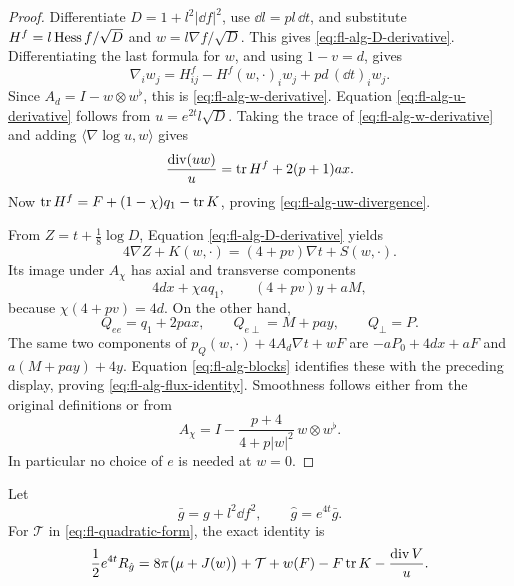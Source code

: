 \begin{proof}
Differentiate \(D=1+l^2|\dd f|^2\), use \(\dd l=pl\,\dd t\), and
substitute \(H^f=l\operatorname{Hess} f/\sqrt D\) and
\(w=l\nabla f/\sqrt D\). This gives
\eqref{eq:fl-alg-D-derivative}. Differentiating the last formula for
\(w\), and using \(1-v=d\), gives
\[
 \nabla_iw_j
 =H^f_{ij}-H^f(w,\cdot)_i w_j+pd\,(\dd t)_i w_j.
\]
Since \(A_d=I-w\otimes w^\flat\), this is
\eqref{eq:fl-alg-w-derivative}.
Equation \eqref{eq:fl-alg-u-derivative} follows from
\(u=e^{2t}l\sqrt D\).
Taking the trace of \eqref{eq:fl-alg-w-derivative} and adding
\(\langle\nabla\log u,w\rangle\) gives
\[
 \frac{\operatorname{div}(uw)}u
 =\operatorname{tr} H^f+2(p+1)ax.
\]
Now \(\operatorname{tr} H^f=F+(1-\chi)q_1-\operatorname{tr} K\), proving
\eqref{eq:fl-alg-uw-divergence}.

From \(Z=t+\frac18\log D\), Equation
\eqref{eq:fl-alg-D-derivative} yields
\[
 4\nabla Z+K(w,\cdot)=(4+pv)\nabla t+S(w,\cdot).
\]
Its image under \(A_\chi\) has axial and transverse components
\[
 4dx+\chi aq_1,\qquad (4+pv)y+aM,
\]
because \(\chi(4+pv)=4d\).
On the other hand,
\[
 Q_{ee}=q_1+2pa x,\qquad Q_{e\perp}=M+pa y,
 \qquad Q_\perp=P.
\]
The same two components of
\(p_Q(w,\cdot)+4A_d\nabla t+wF\) are
\(-aP_0+4dx+aF\) and \(a(M+pa y)+4y\).
Equation \eqref{eq:fl-alg-blocks} identifies these with the preceding
display, proving \eqref{eq:fl-alg-flux-identity}.
Smoothness follows either from the original definitions or from
\begin{equation}
 A_\chi
 =I-\frac{p+4}{4+p|w|^2}\,w\otimes w^\flat.
 \label{eq:fl-alg-smooth-matrix}
\end{equation}
In particular no choice of \(e\) is needed at \(w=0\).
\end{proof}

\begin{proposition}
\label{prop:fl-alg-scalar}
Let
\[
 \bar g=g+l^2\dd f^2,\qquad \hat g=e^{4t}\bar g.
\]
For \(\mathcal T\) in \eqref{eq:fl-quadratic-form}, the exact identity
is
\begin{equation}
 \frac12 e^{4t}R_{\hat g}
 =8\pi\bigl(\mu+J(w)\bigr)+\mathcal T+w(F)
       -F\operatorname{tr} K-\frac{\operatorname{div}V}{u}.
 \label{eq:fl-alg-identity}
\end{equation}
\end{proposition}


